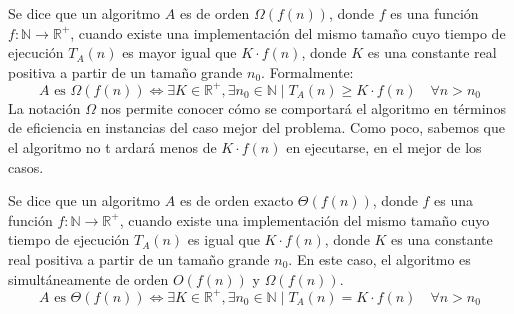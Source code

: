 \begin{definicion}
Se dice que un algoritmo $A$ es de orden $\Omega(f(n))$, donde $f$ es una función $f:\mathbb{N}\rightarrow \mathbb{R}^{+}$, cuando existe una implementación del mismo tamaño cuyo tiempo de ejecución $T_A(n)$ es mayor igual que $K \cdot f(n)$, donde $K$ es una constante real positiva a partir de un tamaño grande $n_0$. Formalmente:
\begin{equation*}
A \text{\ es\ } \Omega(f(n)) \Longleftrightarrow \exists K \in \mathbb{R}^{+}, \exists n_0 \in \mathbb{N} \mid T_A(n) \geq K \cdot f(n)\quad\forall n > n_0
\end{equation*}
La notación $\Omega$ nos permite conocer cómo se comportará el algoritmo en términos de eficiencia en instancias del caso mejor del problema.
Como poco, sabemos que el algoritmo no t ardará menos de $K\cdot f(n)$ en ejecutarse, en el mejor de los casos.
\end{definicion}

\begin{definicion}
Se dice que un algoritmo $A$ es de orden exacto $\Theta(f(n))$, donde $f$ es una función $f:\mathbb{N}\rightarrow \mathbb{R}^{+}$, cuando existe una implementación del mismo tamaño cuyo tiempo de ejecución $T_A(n)$ es igual que $K \cdot f(n)$, donde $K$ es una constante real positiva a partir de un tamaño grande $n_0$. En este caso, el algoritmo es simultáneamente de orden $O(f(n))$ y $\Omega(f(n))$.
\begin{equation*}
A \text{\ es\ } \Theta(f(n)) \Longleftrightarrow \exists K \in \mathbb{R}^{+}, \exists n_0 \in \mathbb{N} \mid T_A(n) = K \cdot f(n)\quad\forall n > n_0
\end{equation*}
\end{definicion}

